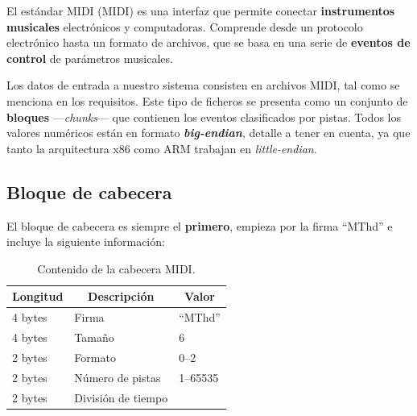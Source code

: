 El estándar \acrshort{MIDI} (\acrlong{MIDI}) es una interfaz que permite conectar \textbf{instrumentos musicales} electrónicos y computadoras. Comprende desde un protocolo electrónico hasta un formato de archivos, que se basa en una serie de \textbf{eventos de control} de parámetros musicales. \cite{wiki_midi}

Los datos de entrada a nuestro sistema consisten en archivos \acrshort{MIDI}, tal como se menciona en los requisitos. Este tipo de ficheros se presenta como un conjunto de \textbf{bloques} ---\textit{chunks}--- que contienen los eventos clasificados por pistas. Todos los valores numéricos están en formato \textbf{\textit{big-endian}}, detalle a tener en cuenta, ya que tanto la arquitectura x86 como ARM trabajan en \textit{little-endian}. \cite{midi}

\subsection{Bloque de cabecera}

El bloque de cabecera es siempre el \textbf{primero}, empieza por la firma ``MThd'' e incluye la siguiente información:

\smallskip

\begin{table}[H]
	\begin{center}
		\begin{tabular}{|l|l|l|}
			\hline \multicolumn{1}{|c|}{\textbf{Longitud}} & \multicolumn{1}{c|}{\textbf{Descripción}} & \multicolumn{1}{c|}{\textbf{Valor}} \\
			\hline 4 bytes & Firma & ``MThd'' \\ 
			\hline 4 bytes & Tamaño & 6 \\ 
			\hline 2 bytes & Formato & 0--2 \\ 
			\hline 2 bytes & Número de pistas & 1--65535 \\ 
			\hline 2 bytes & División de tiempo &  \\ 
			\hline 
		\end{tabular}
		\smallskip
		\caption{\label{tab:midi_header} Contenido de la cabecera MIDI.}
	\end{center}
\end{table}

\smallskip


